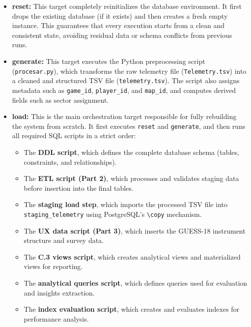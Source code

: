 \documentclass[11pt]{article}
\begin{document}
\begin{itemize}

    \item \textbf{reset: }  
    This target completely reinitializes the database environment. It first drops the existing database (if it exists) and then creates a fresh empty instance. This guarantees that every execution starts from a clean and consistent state, avoiding residual data or schema conflicts from previous runs.

    \medskip

    \item \textbf{generate: }  
    This target executes the Python preprocessing script (\texttt{procesar.py}), which transforms the raw telemetry file (\texttt{Telemetry.tsv}) into a cleaned and structured TSV file (\texttt{telemetry.tsv}). The script also assigns metadata such as \texttt{game\_id}, \texttt{player\_id}, and \texttt{map\_id}, and computes derived fields such as sector assignment.

    \medskip

    \item \textbf{load: }  
    This is the main orchestration target responsible for fully rebuilding the system from scratch. It first executes \texttt{reset} and \texttt{generate}, and then runs all required SQL scripts in a strict order:

    \begin{itemize}
        \item The \textbf{DDL script}, which defines the complete database schema (tables, constraints, and relationships).
        \item The \textbf{ETL script (Part 2)}, which processes and validates staging data before insertion into the final tables.
        \item The \textbf{staging load step}, which imports the processed TSV file into \texttt{staging\_telemetry} using PostgreSQL's \texttt{\textbackslash copy} mechanism.
        \item The \textbf{UX data script (Part 3)}, which inserts the GUESS-18 instrument structure and survey data.
        \item The \textbf{C.3 views script}, which creates analytical views and materialized views for reporting.
        \item The \textbf{analytical queries script}, which defines queries used for evaluation and insights extraction.
        \item The \textbf{index evaluation script}, which creates and evaluates indexes for performance analysis.
    \end{itemize}


\end{itemize}
\end{document}
